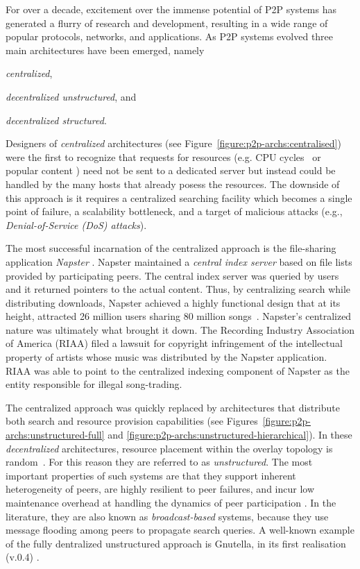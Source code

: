 For over a decade, excitement over the immense potential of P2P systems
has generated a flurry of research and development, resulting in a wide 
range of popular protocols, networks, and applications. As P2P systems evolved
three main architectures have been emerged, namely
\begin{inparaenum}
  \item \emph{centralized},
  \item \emph{decentralized unstructured}, and
  \item \emph{decentralized structured}.
\end{inparaenum}

Designers of \emph{centralized} architectures (see Figure~\ref{figure:p2p-archs:centralised})
were the first to recognize that requests for resources (e.g. CPU 
cycles~\cite{seti} or popular content
\cite{}) need not be sent to a dedicated server but instead could be handled by
the many hosts that already posess the resources. The downside of
this approach is it requires a centralized searching facility which becomes
a single point of failure, a scalability bottleneck, and a target of malicious 
attacks (e.g., \emph{Denial-of-Service (DoS) attacks}).

The most successful incarnation of the centralized approach is
the file-sharing application \emph{Napster}
\cite{}.
Napster maintained a \emph{central index server} based on file lists provided by
participating peers. The central index server was queried by users and it
returned pointers to the actual content. Thus, by centralizing search while
distributing downloads, Napster achieved a highly functional design that 
at its height, attracted 26 million users sharing 80 million 
songs~\cite{jmm_naptopusage_2001}.  
Napster's centralized nature was ultimately what brought it down.
The Recording Industry Association of
America (RIAA) 
filed a lawsuit for copyright infringement of the intellectual
property of artists whose music was distributed by the Napster application.
RIAA was able to point to the centralized indexing component of
Napster as the entity responsible for illegal song-trading.


The centralized approach was quickly replaced by architectures that
distribute both search and resource provision capabilities (see
Figures~\ref{figure:p2p-archs:unstructured-full} and
\ref{figure:p2p-archs:unstructured-hierarchical}). In these \emph{decentralized}
architectures, resource placement within the overlay topology is 
random~\cite{yang_improvep2psearch_2002}. For this
reason they are referred to as \emph{unstructured}. The most important
properties of such systems are that they support inherent heterogeneity of
peers, are highly resilient to peer failures, and incur low maintenance overhead
at handling the dynamics of peer participation \cite{stutzbach_churn_2006}. In
the literature, they are also known as \emph{broadcast-based} systems, because
they use message flooding among peers to propagate
search queries. A well-known example of the fully dentralized unstructured 
approach is Gnutella, in its first realisation (v.0.4) \cite{gnutellav04}.

